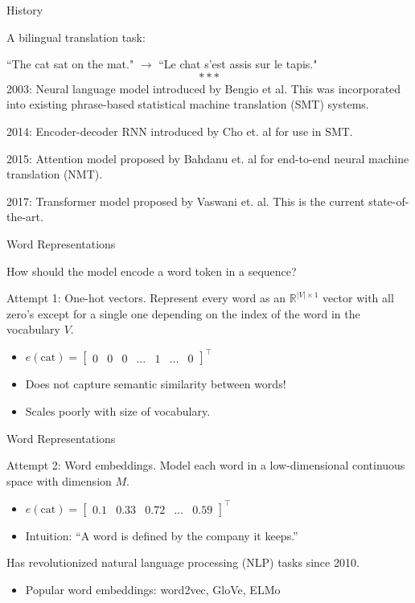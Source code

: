 \documentclass[english]{article}
\begin{document}
\item 
 {History}

A bilingual translation task:

``The cat sat on the mat." $\rightarrow$ ``Le chat s'est assis sur le tapis."
$$***$$
2003: Neural language model introduced by Bengio et al. This was incorporated into existing phrase-based statistical machine translation (SMT) systems.

2014: Encoder-decoder RNN introduced by Cho et. al for use in SMT.

2015: Attention model proposed by Bahdanu et. al for end-to-end neural machine translation (NMT).

2017: Transformer model proposed by Vaswani et. al. This is the current state-of-the-art.
 

\item 
 {Word Representations}

How should the model encode a word token in a sequence?
 
Attempt 1: One-hot vectors. Represent every word as an $\mathbb{R}^{|V|\times 1}$ vector with all zero's except for a single one depending on the index of the word in the vocabulary $V$.
\begin{itemize}
\item $e(\text{cat})=\left[\begin{smallmatrix}
0 & 0 & 0 & \dots & 1 & \dots & 0
\end{smallmatrix}\right]^\top$
\item Does not capture semantic similarity between words!
\item Scales poorly with size of vocabulary.
\end{itemize}
 

\item 
 {Word Representations}

Attempt 2: Word embeddings. Model each word in a low-dimensional continuous space with dimension $M$.
\begin{itemize}
\item $e(\text{cat})=\left[\begin{smallmatrix}
0.1 & 0.33 & 0.72 & \dots & 0.59
\end{smallmatrix}\right]^\top$
\item Intuition: ``A word is defined by the company it keeps.''
\end{itemize}
\vspace{5mm}
Has revolutionized natural language processing (NLP) tasks since 2010.
\begin{itemize}
\item Popular word embeddings: word2vec, GloVe, ELMo
\end{itemize}
 
\end{document}
